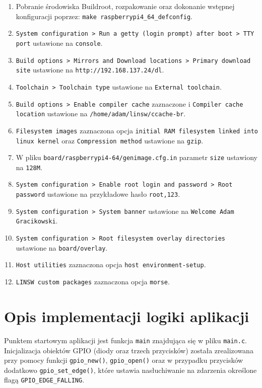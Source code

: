 \documentclass{article}
\begin{document}
\begin{enumerate}[label=\arabic*.]
    \item Pobranie środowiska Buildroot, rozpakowanie oraz dokonanie wstępnej konfiguracji poprzez: \texttt{make raspberrypi4\_64\_defconfig}.
    \item \texttt{System configuration > Run a getty (login prompt) after boot > TTY port} ustawione na \texttt{console}.
    \item \texttt{Build options > Mirrors and Download locations > Primary download site} ustawione na \texttt{http://192.168.137.24/dl}.
    \item \texttt{Toolchain > Toolchain type} ustawione na \texttt{External toolchain}.
    \item \texttt{Build options > Enable compiler cache} zaznaczone i \texttt{Compiler cache location} ustawione na \texttt{/home/adam/linsw/ccache-br}.
    \item \texttt{Filesystem images} zaznaczona opcja \texttt{initial RAM filesystem 
linked into linux kernel} oraz \texttt{Compression method} ustawione na \texttt{gzip}.
    \item W pliku \texttt{board/raspberrypi4-64/genimage.cfg.in} parametr \texttt{size} ustawiony na \texttt{128M}.
    \item \texttt{System configuration > Enable root login and password > Root password} ustawione na przykładowe hasło \texttt{root,123}.
    \item \texttt{System configuration > System banner} ustawione na \texttt{Welcome Adam Gracikowski}.
    \item \texttt{System configuration > Root filesystem overlay directories} ustawione na \texttt{board/overlay}.
    \item \texttt{Host utilities} zaznaczona opcja \texttt{host environment-setup}.
    \item \texttt{LINSW custom packages} zaznaczona opcja \texttt{morse}.
\end{enumerate}

\section{Opis implementacji logiki aplikacji}

Punktem startowym aplikacji jest funkcja \texttt{main} znajdująca się w pliku \texttt{main.c}. Inicjalizacja obiektów GPIO (diody oraz trzech przycisków) została zrealizowana przy pomocy funkcji \texttt{gpio\_new()}, \texttt{gpio\_open()} oraz w przypadku przycisków dodatkowo \texttt{gpio\_set\_edge()}, które ustawia nasłuchiwanie na zdarzenia określone flagą \texttt{GPIO\_EDGE\_FALLING}.
\end{document}
